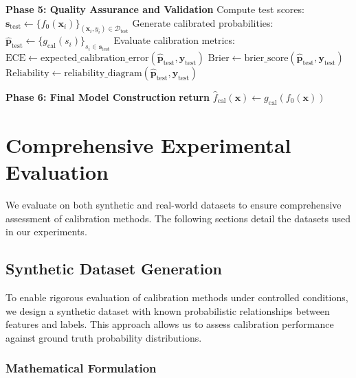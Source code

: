 \documentclass[12pt, a4paper]{article}
\begin{document}
\begin{algorithm}[!h]
\begin{algorithmic}[1]
\STATE \textbf{Phase 5: Quality Assurance and Validation}
\STATE Compute test scores: $\mathbf{s}_{\text{test}} \leftarrow \{f_0(\mathbf{x}_i)\}_{(\mathbf{x}_i, y_i) \in \mathcal{D}_{\text{test}}}$
\STATE Generate calibrated probabilities: $\hat{\mathbf{p}}_{\text{test}} \leftarrow \{g_{\text{cal}}(s_i)\}_{s_i \in \mathbf{s}_{\text{test}}}$
\STATE Evaluate calibration metrics:
\STATE \hspace{0.5cm} $\text{ECE} \leftarrow \text{expected\_calibration\_error}(\hat{\mathbf{p}}_{\text{test}}, \mathbf{y}_{\text{test}})$
\STATE \hspace{0.5cm} $\text{Brier} \leftarrow \text{brier\_score}(\hat{\mathbf{p}}_{\text{test}}, \mathbf{y}_{\text{test}})$
\STATE \hspace{0.5cm} $\text{Reliability} \leftarrow \text{reliability\_diagram}(\hat{\mathbf{p}}_{\text{test}}, \mathbf{y}_{\text{test}})$

\STATE \textbf{Phase 6: Final Model Construction}
\STATE \textbf{return} $\hat{f}_{\text{cal}}(\mathbf{x}) \leftarrow g_{\text{cal}}(f_0(\mathbf{x}))$ 

\end{algorithmic}
\end{algorithm}


\section{Comprehensive Experimental Evaluation} \label{sec:Evaluation}
We evaluate on both synthetic and real-world datasets to ensure comprehensive assessment of calibration methods. The following sections detail the datasets used in our experiments.

\subsection{Synthetic Dataset Generation} \label{sec:Synth_Dataset}

To enable rigorous evaluation of calibration methods under controlled conditions, we design a synthetic dataset with known probabilistic relationships between features and labels. This approach allows us to assess calibration performance against ground truth probability distributions.

\subsubsection{Mathematical Formulation}
\end{document}
